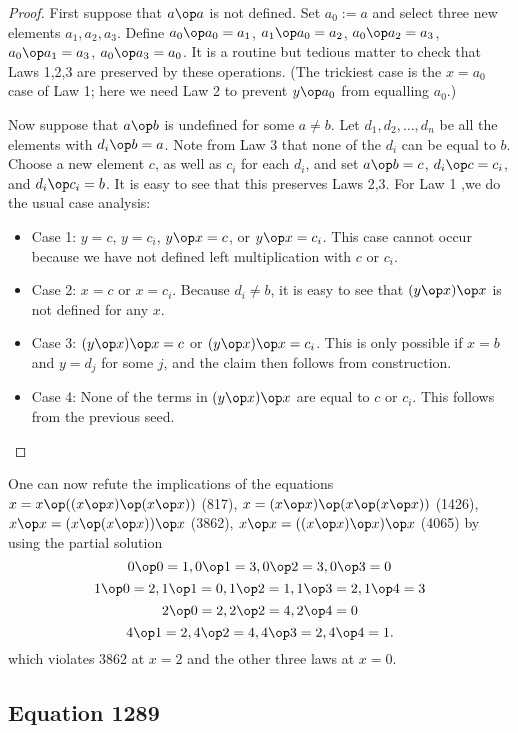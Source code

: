 \begin{proof}  First suppose that $a \op a$ is not defined.  Set $a_0 := a$ and select three new elements $a_1,a_2,a_3$.  Define $a_0 \op a_0 = a_1$, $a_1 \op a_0 = a_2$, $a_0 \op a_2 = a_3$, $a_0 \op a_1 = a_3$, $a_0 \op a_3 = a_0$.  It is a routine but tedious matter to check that Laws 1,2,3 are preserved by these operations.  (The trickiest case is the $x=a_0$ case of Law 1; here we need Law 2 to prevent $y \op a_0$ from equalling $a_0$.)

Now suppose that $a \op b$ is undefined for some $a \neq b$.  Let $d_1,d_2,\dots,d_n$ be all the elements with $d_i \op b = a$.  Note from Law 3 that none of the $d_i$ can be equal to $b$.  Choose a new element $c$, as well as $c_i$ for each $d_i$, and set $a \op b = c$, $d_i \op c = c_i$, and $d_i \op c_i = b$.  It is easy to see that this preserves Laws 2,3.  For Law 1 ,we do the usual case analysis:
\begin{itemize}
\item Case 1: $y = c$, $y = c_i$, $y \op x = c$, or $y \op x = c_i$.  This case cannot occur because we have not defined left multiplication with $c$ or $c_i$.
\item Case 2: $x = c$ or $x = c_i$.  Because $d_i \neq b$, it is easy to see that $(y \op x) \op x$ is not defined for any $x$.
\item Case 3: $(y \op x) \op x = c$ or $(y \op x) \op x = c_i$.  This is only possible if $x=b$ and $y = d_j$ for some $j$, and the claim then follows from construction.
\item Case 4: None of the terms in $(y \op x) \op x$ are equal to $c$ or $c_i$.  This follows from the previous seed.
\end{itemize}
\end{proof}

One can now refute the implications of the equations $x = x \op ((x \op x) \op (x \op x))$ (817), $x = (x \op x) \op (x \op (x \op x))$ (1426), $x \op x = (x \op (x \op x)) \op x$ (3862), $x \op x = ((x \op x) \op x) \op x$ (4065) by using the partial solution
$$ 0 \op 0 = 1, 0 \op 1 = 3, 0 \op 2 = 3, 0 \op 3 = 0$$
$$1\op 0 = 2, 1 \op 1 = 0, 1 \op 2 = 1, 1 \op 3 =2 , 1 \op 4 = 3$$
$$ 2 \op 0 = 2, 2 \op 2 = 4, 2 \op 4 = 0$$
$$ 4 \op 1 = 2, 4 \op 2 = 4, 4 \op 3 = 2, 4 \op 4 = 1.$$
which violates 3862 at $x=2$ and the other three laws at $x=0.$

\subsection{Equation 1289}

